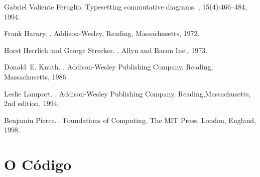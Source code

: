 \documentclass[a4paper,11pt]{article}
\begin{document}
%
%

\newcommand{\noopsort}[1]{} \newcommand{\singleletter}[1]{#1}
\begin{thebibliography}{1}

{Gabriel Valiente} Feruglio.
\newblock Typesetting commutative diagrams.
, 15(4):466--484, 1994.

Frank Harary.
.
\newblock Addison-Wesley, Reading, Massachusetts, 1972.

Horst Herrlich and George Strecker.
.
\newblock Allyn and Bacon Inc., 1973.

Donald~E. Knuth.
.
\newblock Addison-Wesley Publishing Company, Reading, Massachusetts, 1986.

Leslie Lamport.
.
\newblock Addison-Wesley Publishing Company, Reading,Massachusetts, 2nd
  edition, 1994.

Benjamin Pierce.
.
\newblock Foundations of Computing. The MIT Press, London, England, 1998.

\end{thebibliography}

\appendix
\section{O Código}

{\scriptsize
}
\end{document}
